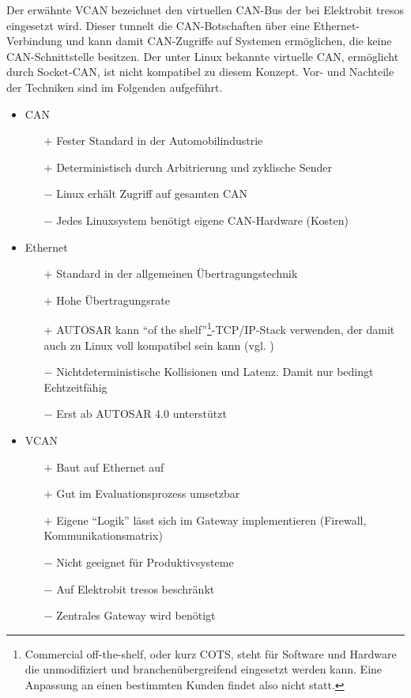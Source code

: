 \documentclass[
  a4paper,					    %
  twoside,
  DIV=calc,     				%
  bibliography=totoc,
  cleardoublepage=empty,
  ngerman,     					%
  final       					%
]{scrbook}
\begin{document}
Der erwähnte VCAN bezeichnet den virtuellen CAN-Bus der bei Elektrobit tresos eingesetzt wird. Dieser tunnelt die CAN-Botschaften über eine Ethernet-Verbindung und kann damit CAN-Zugriffe auf Systemen ermöglichen, die keine CAN-Schnittstelle besitzen. Der unter Linux bekannte virtuelle CAN, ermöglicht durch Socket-CAN, ist nicht kompatibel zu diesem Konzept. Vor- und Nachteile der Techniken sind im Folgenden aufgeführt.

\begin{itemize}
    \item CAN
    \begin{itemize}
        \item[$+$] Fester Standard in der Automobilindustrie
        \item[$+$] Deterministisch durch Arbitrierung und zyklische Sender
        \item[$-$] Linux erhält Zugriff auf gesamten CAN
        \item[$-$] Jedes Linuxsystem benötigt eigene CAN-Hardware (Kosten)
    \end{itemize}
    \item Ethernet
    \begin{itemize}
        \item[$+$] Standard in der allgemeinen Übertragungstechnik
        \item[$+$] Hohe Übertragungsrate
        \item[$+$] AUTOSAR kann "`of the shelf"'\footnote{Commercial off-the-shelf, oder kurz COTS, steht für Software und Hardware die unmodifiziert und branchenübergreifend eingesetzt werden kann. Eine Anpassung an einen bestimmten Kunden findet also nicht statt.}-TCP/IP-Stack verwenden, der damit auch zu Linux voll kompatibel sein kann (vgl. \cite[S. 21]{autosar_eth})
        \item[$-$] Nichtdeterministische Kollisionen und Latenz. Damit nur bedingt Echtzeitfähig
        \item[$-$] Erst ab AUTOSAR 4.0 unterstützt
    \end{itemize}
    \item VCAN
    \begin{itemize}
        \item[$+$] Baut auf Ethernet auf
        \item[$+$] Gut im Evaluationsprozess umsetzbar
        \item[$+$] Eigene "`Logik"' lässt sich im Gateway implementieren (Firewall, Kommunikationsmatrix)
        \item[$-$] Nicht geeignet für Produktivsysteme
        \item[$-$] Auf Elektrobit tresos beschränkt
        \item[$-$] Zentrales Gateway wird benötigt
    \end{itemize}
\end{itemize}
\end{document}
